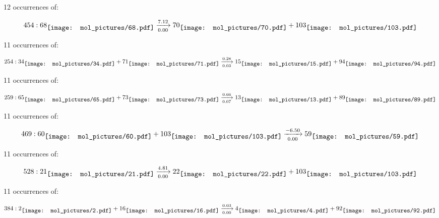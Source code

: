 \documentclass{article}
\begin{document}
\vspace{1cm}


12 occurrences of:

$$
454:  
68
\raisebox{-.5\height}{\texttt{[image: mol\_pictures/68.pdf]}}
\xrightarrow[0.00]{7.12}
70
\raisebox{-.5\height}{\texttt{[image: mol\_pictures/70.pdf]}}
+
103
\raisebox{-.5\height}{\texttt{[image: mol\_pictures/103.pdf]}}
$$



\vspace{1cm}


11 occurrences of:

$$
254:  
34
\raisebox{-.5\height}{\texttt{[image: mol\_pictures/34.pdf]}}
+
71
\raisebox{-.5\height}{\texttt{[image: mol\_pictures/71.pdf]}}
\xrightarrow[0.03]{0.28}
15
\raisebox{-.5\height}{\texttt{[image: mol\_pictures/15.pdf]}}
+
94
\raisebox{-.5\height}{\texttt{[image: mol\_pictures/94.pdf]}}
$$



\vspace{1cm}


11 occurrences of:

$$
259:  
65
\raisebox{-.5\height}{\texttt{[image: mol\_pictures/65.pdf]}}
+
73
\raisebox{-.5\height}{\texttt{[image: mol\_pictures/73.pdf]}}
\xrightarrow[0.07]{0.66}
13
\raisebox{-.5\height}{\texttt{[image: mol\_pictures/13.pdf]}}
+
89
\raisebox{-.5\height}{\texttt{[image: mol\_pictures/89.pdf]}}
$$



\vspace{1cm}


11 occurrences of:

$$
469:  
60
\raisebox{-.5\height}{\texttt{[image: mol\_pictures/60.pdf]}}
+
103
\raisebox{-.5\height}{\texttt{[image: mol\_pictures/103.pdf]}}
\xrightarrow[0.00]{-6.50}
59
\raisebox{-.5\height}{\texttt{[image: mol\_pictures/59.pdf]}}
$$



\vspace{1cm}


11 occurrences of:

$$
528:  
21
\raisebox{-.5\height}{\texttt{[image: mol\_pictures/21.pdf]}}
\xrightarrow[0.00]{4.81}
22
\raisebox{-.5\height}{\texttt{[image: mol\_pictures/22.pdf]}}
+
103
\raisebox{-.5\height}{\texttt{[image: mol\_pictures/103.pdf]}}
$$



\vspace{1cm}


11 occurrences of:

$$
384:  
2
\raisebox{-.5\height}{\texttt{[image: mol\_pictures/2.pdf]}}
+
16
\raisebox{-.5\height}{\texttt{[image: mol\_pictures/16.pdf]}}
\xrightarrow[0.00]{0.03}
4
\raisebox{-.5\height}{\texttt{[image: mol\_pictures/4.pdf]}}
+
92
\raisebox{-.5\height}{\texttt{[image: mol\_pictures/92.pdf]}}
$$



\vspace{1cm}
\end{document}
